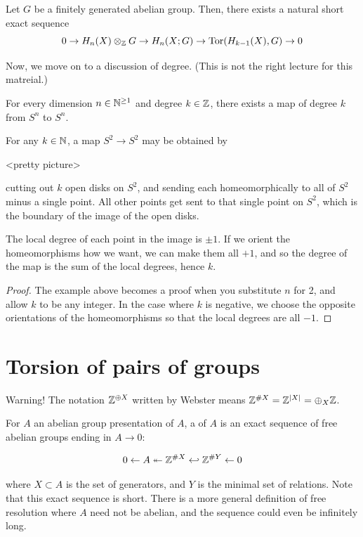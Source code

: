 \documentclass[11pt,leqno,oneside]{amsart}
\newenvironment{dateenv}{
  \vspace{1em}
}{
  \vspace{1em}
}
\newcommand{\mydate}[4]{
  \newdate{#1}{#2}{#3}{#4}
  \begin{dateenv}
    \hfill\displaydate{#1}
  \end{dateenv}
}
\numberwithin{thm}{section}
\newcommand{\homl}[1][n]{H_{#1}}
\begin{document}
\begin{thm}
  Let \(G\) be a finitely generated abelian group. Then, there
  exists a natural short exact sequence \[
    0 \to \homl(X) \otimes_\Z G \to \homl(X;G) \to \Tor(\homl[k-1](X),G)
    \to 0
  \]
\end{thm}
Now, we move on to a discussion of degree. (This is not the right
lecture for this matreial.)
\begin{thm}
  For every dimension $n \in {\mathbb N}^{\geq 1}$ and degree $k \in {\mathbb Z}$, there exists a map of degree $k$ from $S^n$ to $S^n$.
\end{thm}
\begin{example}
  For any $k \in {\mathbb N}$, a map $S^2 \to S^2$ may be obtained by

  <pretty picture>

  cutting out $k$ open disks on $S^2$, and sending each homeomorphically to all of $S^2$ minus a single point.  All other points get sent to that single point on $S^2$, which is the boundary of the image of the open disks.

  The local degree of each point in the image is $\pm 1$.  If we orient the homeomorphisms how we want, we can make them all $+1$, and so the degree of the map is the sum of the local degrees, hence $k$.
\end{example}
\begin{proof}
  The example above becomes a proof when you substitute $n$ for 2, and allow $k$ to be any integer.  In the case where $k$ is negative, we choose the opposite orientations of the homeomorphisms so that the local degrees are all $-1$.
\end{proof}


\mydate{dk}{17}{4}{2017}

\section*{Torsion of pairs of groups}

Warning!  The notation ${\mathbb Z}^{\oplus X}$ written by Webster means ${\mathbb Z}^{\#X} = {\mathbb Z}^{|X|} = \oplus_X {\mathbb Z}$.

\begin{defn}
  For $A$ an abelian group presentation of $A$, a  of $A$ is an exact sequence of free abelian groups ending in $A \to 0$:

  $$0 \leftarrow A \twoheadleftarrow {\mathbb Z}^{\# X} \hookleftarrow {\mathbb Z}^{\# Y} \leftarrow 0$$

  where $X \subset A$ is the set of generators, and $Y$ is the minimal set of relations.  Note that this exact sequence is short.  There is a more general definition of free resolution where $A$ need not be abelian, and the sequence could even be infinitely long.
\end{defn}
\end{document}
